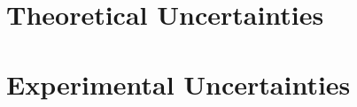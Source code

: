 
\section{Theoretical Uncertainties}
\label{sec:TheoryUnc}

\section{Experimental Uncertainties}
\label{sec:ExpUnc}